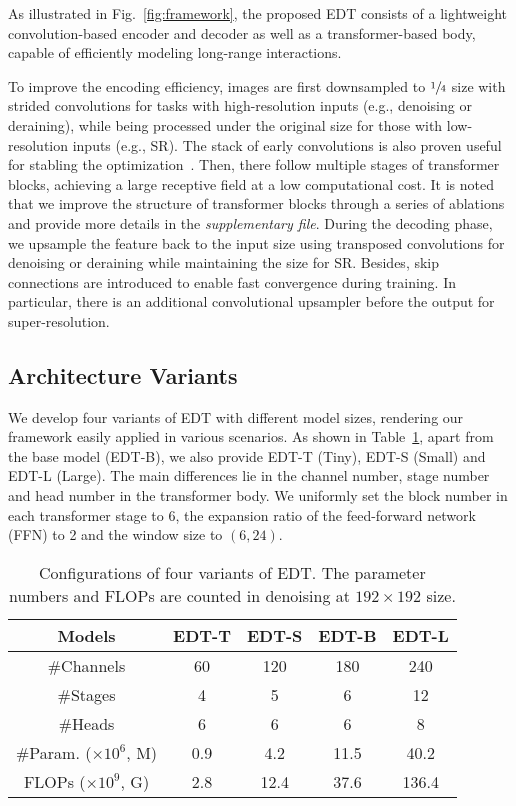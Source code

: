 \documentclass[runningheads]{llncs}
\makeatletter
\newcommand*{\eg}{e.g.\@\xspace}
\makeatother
\begin{document}
	As illustrated in Fig.~\ref{fig:framework}, the proposed EDT consists of a lightweight convolution-based encoder and decoder as well as a transformer-based body, capable of efficiently modeling long-range interactions. 

	To improve the encoding efficiency, images are first downsampled to $\sfrac{1}{4}$ size with strided convolutions for tasks with high-resolution inputs (\eg, denoising or deraining), while being processed under the original size for those with low-resolution inputs (\eg, SR). The stack of early convolutions is also proven useful for stabling the optimization~\cite{xiao2021early}. Then, there follow multiple stages of transformer blocks, achieving a large receptive field at a low computational cost. It is noted that we improve the structure of transformer blocks through a series of ablations and provide more details in the \textit{supplementary file}. During the decoding phase, we upsample the feature back to the input size using transposed convolutions for denoising or deraining while maintaining the size for SR. Besides, skip connections are introduced to enable fast convergence during training. In particular, there is an additional convolutional upsampler before the output for super-resolution. 
	
	\subsection{Architecture Variants}
	We develop four variants of EDT with different model sizes, rendering our framework easily applied in various scenarios. As shown in Table~\ref{tab:conf}, apart from the base model (EDT-B), we also provide EDT-T (Tiny), EDT-S (Small) and EDT-L (Large). The main differences lie in the channel number, stage number and head number in the transformer body. We uniformly set the block number in each transformer stage to 6, the expansion ratio of the feed-forward network (FFN) to 2 and the window size to $(6, 24)$. 

	\begin{table}[t]
		\caption{Configurations of four variants of EDT. The parameter numbers and FLOPs are counted in denoising at $192 \times 192$ size.}
		\renewcommand\arraystretch{1.0}
\begin{center}
\begin{tabular}{|c | c | c | c | c |}
				\hline
				Models & EDT-T & EDT-S & EDT-B & EDT-L \\
				\hline
				\#Channels & 60 & 120 & 180 & 240 \\
				\#Stages & 4 & 5 & 6 & 12 \\
\#Heads & 6 & 6 & 6 & 8 \\
				\hline
				\#Param. ($\times 10^6$, M) & 0.9 & 4.2 & 11.5 & 40.2 \\
				FLOPs ($\times 10^9$, G) & 2.8 & 12.4 & 37.6 &  136.4 \\
				\hline      
			\end{tabular}
\end{center}
\vspace{-0.3in}
		\label{tab:conf}
	\end{table}
	
\end{document}
